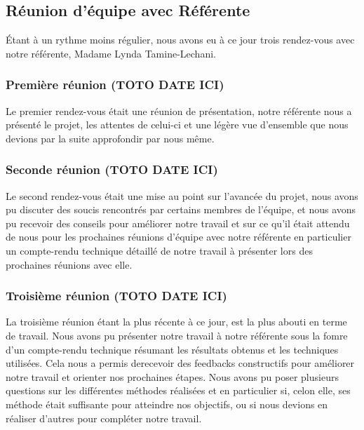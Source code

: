 \documentclass[12pt,a4paper]{article}
\begin{document}
\subsection{Réunion d'équipe avec Référente}
Étant à un rythme moins régulier, nous avons eu à ce jour trois rendez-vous avec notre référente, Madame Lynda Tamine-Lechani.
\subsubsection{Première réunion (\textbf{TOTO DATE ICI})}
Le premier rendez-vous était une réunion de présentation, notre référente nous a présenté le projet, les attentes de celui-ci et
une légère vue d'ensemble que nous devions par la suite approfondir par nous même.\smallbreak

\subsubsection{Seconde réunion (\textbf{TOTO DATE ICI})}
Le second rendez-vous était une mise au point sur l'avancée du projet, nous avons pu discuter des soucis rencontrés par certains membres de l'équipe, 
et nous avons pu recevoir des conseils pour améliorer notre travail et sur ce qu'il était attendu de nous pour les prochaines réunions d'équipe avec notre référente
en particulier un compte-rendu technique détaillé de notre travail à présenter lors des prochaines réunions avec elle.

\subsubsection{Troisième réunion (\textbf{TOTO DATE ICI})}
La troisième réunion étant la plus récente à ce jour, est la plus abouti en terme de travail.
Nous avons pu présenter notre travail à notre référente sous la fomre d'un compte-rendu technique résumant les résultats obtenus et les techniques utilisées.
Cela nous a permis derecevoir des feedbacks constructifs pour améliorer notre travail et orienter nos prochaines étapes.
Nous avons pu poser plusieurs questions sur les différentes méthodes réalisées et en particulier si, celon elle, ses méthode était suffisante pour atteindre nos objectifs, 
ou si nous devions en réaliser d'autres pour compléter notre travail.\smallbreak
\end{document}

